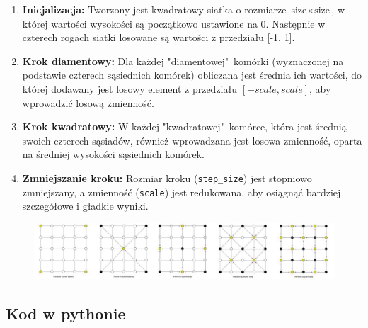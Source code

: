\documentclass{article}
\begin{document}
\begin{enumerate}
    \item \textbf{Inicjalizacja:} Tworzony jest kwadratowy siatka o rozmiarze \( \text{size} \times \text{size} \), w której wartości wysokości są początkowo ustawione na 0. Następnie w czterech rogach siatki losowane są wartości z przedziału [-1, 1].
    \item \textbf{Krok diamentowy:} Dla każdej "diamentowej"\ komórki (wyznaczonej na podstawie czterech sąsiednich komórek) obliczana jest średnia ich wartości, do której dodawany jest losowy element z przedziału \([-scale, scale]\), aby wprowadzić losową zmienność.
    \item \textbf{Krok kwadratowy:} W każdej "kwadratowej"\ komórce, która jest średnią swoich czterech sąsiadów, również wprowadzana jest losowa zmienność, oparta na średniej wysokości sąsiednich komórek.
    \item \textbf{Zmniejszanie kroku:} Rozmiar kroku (\texttt{step\_size}) jest stopniowo zmniejszany, a zmienność (\texttt{scale}) jest redukowana, aby osiągnąć bardziej szczegółowe i gładkie wyniki.
\end{enumerate}

\begin{figure}[H]
    \centering
    \includegraphics[width=1\linewidth]{rekurencja.jpg}
    \label{rekurencja}
\end{figure}

\subsection{Kod w pythonie}
\end{document}
